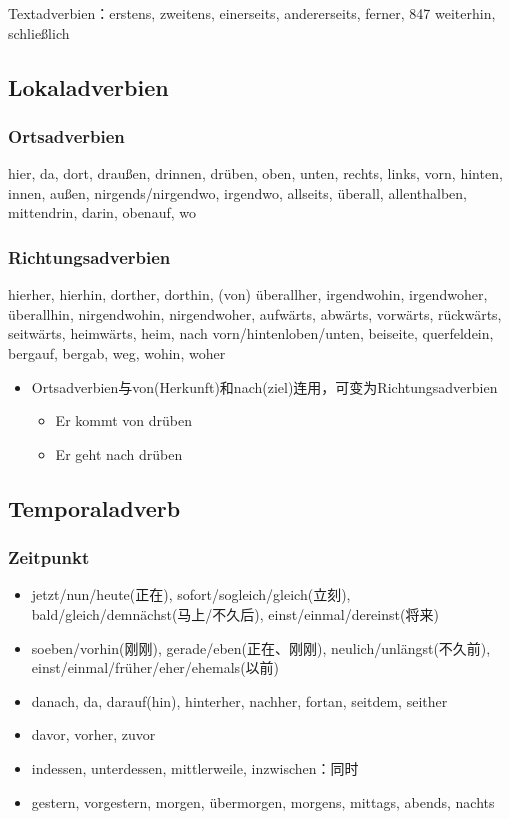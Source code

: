 \documentclass[UTF8]{report}
\begin{document}
Textadverbien：erstens, zweitens, einerseits, andererseits, ferner, 847 weiterhin, schließlich

\subsection{Lokaladverbien}
\subsubsection{Ortsadverbien}
hier, da, dort, draußen, drinnen, drüben, oben, unten, rechts, links, vorn, hinten, innen, außen, nirgends/nirgendwo, irgendwo, allseits, überall, allenthalben, mittendrin, darin, obenauf, wo

\subsubsection{Richtungsadverbien}
hierher, hierhin, dorther, dorthin, (von) überallher, irgendwohin, irgendwoher, überallhin, nirgendwohin, nirgendwoher, aufwärts, abwärts, vorwärts, rückwärts, seitwärts, heimwärts, heim, nach vorn/hintenloben/unten, beiseite, querfeldein, bergauf, bergab, weg, wohin, woher

\begin{itemize}
    \item Ortsadverbien与von(Herkunft)和nach(ziel)连用，可变为Richtungsadverbien
    \begin{itemize}
        \item Er kommt von drüben
        \item Er geht nach drüben
    \end{itemize}
\end{itemize}

\subsection{Temporaladverb}
\subsubsection{Zeitpunkt}

\begin{itemize}
    \item jetzt/nun/heute(正在), sofort/sogleich/gleich(立刻), bald/gleich/demnächst(马上/不久后), einst/einmal/dereinst(将来)
    
    \item soeben/vorhin(刚刚), gerade/eben(正在、刚刚), neulich/unlängst(不久前), einst/einmal/früher/eher/ehemals(以前)
    \item danach, da, darauf(hin), hinterher, nachher, fortan, seitdem, seither
    \item davor, vorher, zuvor
    \item indessen, unterdessen, mittlerweile, inzwischen：同时
    \item gestern, vorgestern, morgen, übermorgen, morgens, mittags, abends, nachts
\end{itemize}
\end{document}
